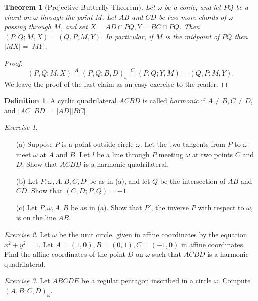 \documentclass[letterpaper,11pt]{article}
\newtheorem{thm}{Theorem}
\theoremstyle{definition}
\newtheorem{defn}{Definition}
\theoremstyle{remark}
\newtheorem{exer}{Exercise}
\begin{document}
\begin{thm}[Projective Butterfly Theorem]\label{butterfly} Let $\omega$ be a conic, and let $PQ$ be a chord on $\omega$ through the point $M$. Let $AB$ and $CD$ be two more chords of $\omega$ passing through $M$, and set $X = AD\cap PQ, Y = BC\cap PQ$. Then $(P,Q;M,X) = (Q,P;M,Y)$. In particular, if $M$ is the midpoint of $PQ$ then $|MX| = |MY|$.
\end{thm}
\begin{proof}
\[
(P,Q;M,X) \stackrel{A}{=} (P,Q;B,D)_{\omega} \stackrel{C}{=} (P,Q;Y,M) = (Q,P;M,Y).
\]
We leave the proof of the last claim as an easy exercise to the reader.
\end{proof}

\begin{defn} A cyclic quadrilateral $ACBD$ is called \emph{harmonic} if $A\ne B, C\ne D$, and $|AC||BD| = |AD||BC|$.
\end{defn}

\begin{exer}\label{harmquad}
\begin{itemize}
\item[(a)] Suppose $P$ is a point outside circle $\omega$. Let the two tangents from $P$ to $\omega$ meet $\omega$ at $A$ and $B$. Let $l$ be a line through $P$ meeting $\omega$ at two points $C$ and $D$. Show that $ACBD$ is a harmonic quadrilateral.

\item[(b)] Let $P,\omega,A,B,C,D$ be as in (a), and let $Q$ be the intersection of $AB$ and $CD$. Show that $(C,D;P,Q) = -1$.

\item[(c)] Let $P,\omega,A,B$ be as in (a). Show that $P'$, the inverse $P$ with respect to $\omega$, is on the line $AB$.
\end{itemize}
\end{exer}

\begin{exer} Let $\omega$ be the unit circle, given in affine coordinates by the equation $x^2+y^2 = 1$. Let $A = (1,0), B = (0,1), C = (-1,0)$ in affine coordinates. Find the affine coordinates of the point $D$ on $\omega$ such that $ACBD$ is a harmonic quadrilateral.
\end{exer}

\begin{exer} Let $ABCDE$ be a regular pentagon inscribed in a circle $\omega$. Compute $(A,B;C,D)_\omega$.
\end{exer}
\end{document}
